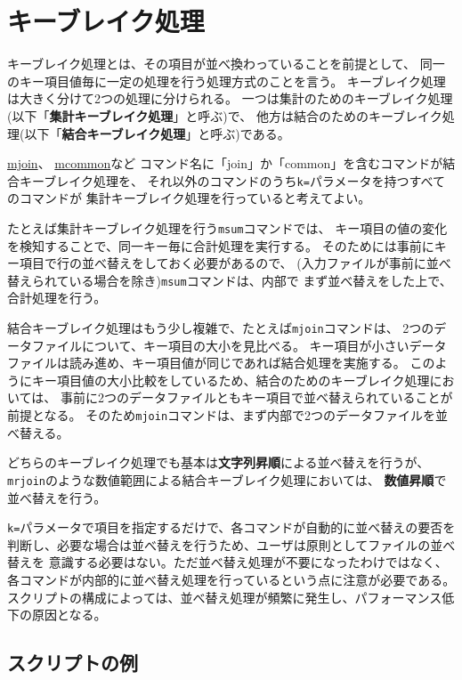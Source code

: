 
%

\section{キーブレイク処理\label{sect:keybreak}}

キーブレイク処理とは、その項目が並べ換わっていることを前提として、
同一のキー項目値毎に一定の処理を行う処理方式のことを言う。
キーブレイク処理は大きく分けて2つの処理に分けられる。
一つは集計のためのキーブレイク処理(以下「{\bf 集計キーブレイク処理}」と呼ぶ)で、
他方は結合のためのキーブレイク処理(以下「{\bf 結合キーブレイク処理}」と呼ぶ)である。

\hyperref[sect:mjoin]{mjoin}、
\hyperref[sect:mcommon]{mcommon}など
コマンド名に「join」か「common」を含むコマンドが結合キーブレイク処理を、
それ以外のコマンドのうち\verb|k=|パラメータを持つすべてのコマンドが
集計キーブレイク処理を行っていると考えてよい。

たとえば集計キーブレイク処理を行う\verb|msum|コマンドでは、
キー項目の値の変化を検知することで、同一キー毎に合計処理を実行する。
そのためには事前にキー項目で行の並べ替えをしておく必要があるので、
(入力ファイルが事前に並べ替えられている場合を除き)\verb|msum|コマンドは、内部で
まず並べ替えをした上で、合計処理を行う。

結合キーブレイク処理はもう少し複雑で、たとえば\verb|mjoin|コマンドは、
2つのデータファイルについて、キー項目の大小を見比べる。
キー項目が小さいデータファイルは読み進め、キー項目値が同じであれば結合処理を実施する。
このようにキー項目値の大小比較をしているため、結合のためのキーブレイク処理においては、
事前に2つのデータファイルともキー項目で並べ替えられていることが前提となる。
そのため\verb|mjoin|コマンドは、まず内部で2つのデータファイルを並べ替える。

どちらのキーブレイク処理でも基本は{\bf 文字列昇順}による並べ替えを行うが、
\verb|mrjoin|のような数値範囲による結合キーブレイク処理においては、
{\bf 数値昇順}で並べ替えを行う。

\verb|k=|パラメータで項目を指定するだけで、各コマンドが自動的に並べ替えの要否を
判断し、必要な場合は並べ替えを行うため、ユーザは原則としてファイルの並べ替えを
意識する必要はない。ただ並べ替え処理が不要になったわけではなく、
各コマンドが内部的に並べ替え処理を行っているという点に注意が必要である。
スクリプトの構成によっては、並べ替え処理が頻繁に発生し、パフォーマンス低下の原因となる。

\subsection*{スクリプトの例}

